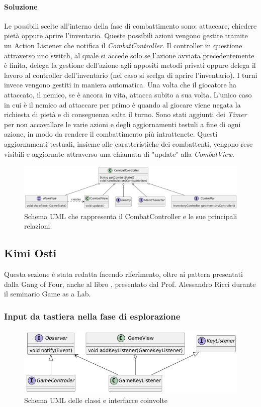\documentclass[a4paper,12pt]{report}
\begin{document}
\paragraph{Soluzione} Le possibili scelte all'interno della fase di combattimento sono: attaccare, chiedere pietà oppure
aprire l'inventario. Queste possibili azioni vengono gestite tramite un Action Listener che notifica
il \textit{CombatController}. Il controller in questione attraverso uno switch, al quale si accede solo se l'azione avviata
precedentemente è finita, delega la gestione dell'azione agli appositi metodi privati oppure delega il lavoro al controller
dell'inventario (nel caso si scelga di aprire l'inventario). 
I turni invece vengono gestiti in maniera automatica. Una volta che il giocatore ha attaccato, il nemico, se è ancora in vita, 
attacca subito a sua volta. L'unico caso in cui è il nemico ad attaccare per primo è quando al giocare viene negata
la richiesta di pietà e di conseguenza salta il turno.
Sono stati aggiunti dei \textit{Timer} per non accavallare le varie azioni e degli aggiornamenti testuli a fine di ogni azione, in modo da
rendere il combattimento più intrattenete. Questi aggiornamenti testuali, insieme alle caratteristiche dei combattenti, vengono
rese visibili e aggiornate attraverso una chiamata di "update" alla \textit{CombatView}. 
\begin{figure}[H]
	\centering{}
	\includegraphics[width=\textwidth]{img/combatController.png}
	\caption{Schema UML che rappresenta il CombatController e le sue principali relazioni.}
	\label{img:combatController}
\end{figure}

\subsection{Kimi Osti}
Questa sezione è stata redatta facendo riferimento, oltre ai pattern presentati dalla Gang of Four, anche al libro \cite{nystrom2014}, presentato dal Prof. Alessandro Ricci durante il seminario Game as a Lab.

\subsubsection{Input da tastiera nella fase di esplorazione}
\begin{figure}[H]
	\centering
	\includegraphics[width=\textwidth]{img/observer-gameview.png}
	\caption{Schema UML delle classi e interfacce coinvolte}
	\label{img:observer-gameview}
\end{figure}
\end{document}
